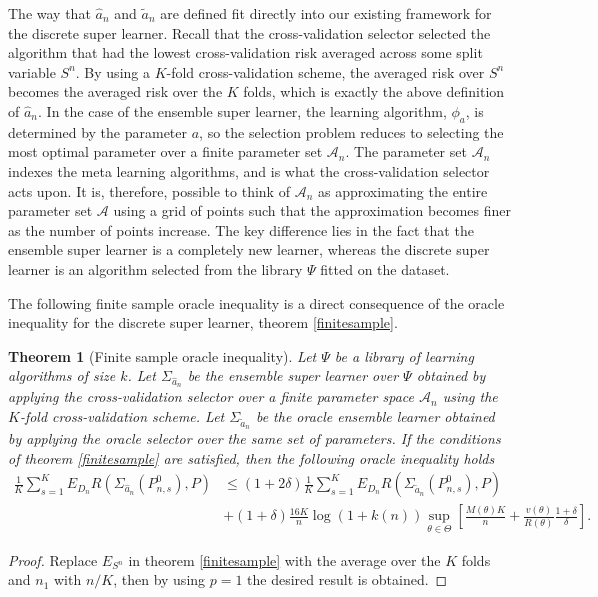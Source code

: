 \documentclass[11pt, a4paper]{article}
\newtheorem{theorem}{Theorem}
\theoremstyle{definition}
\theoremstyle{remark}
\newcommand{\btheta}{\theta}
\newcommand{\Sn}{S^n}
\newcommand{\lib}{\Psi}
\newcommand{\meta}{\phi}
\newcommand{\esl}{\Sigma}
\begin{document}
The way that $ \hat{a}_n  $ and $ \tilde{a}_n $ are defined fit directly into our existing framework for the discrete super learner. Recall that the cross-validation selector selected the algorithm that had the lowest cross-validation risk averaged across some split variable $ \Sn $. By using a $ K $-fold cross-validation scheme, the averaged risk over $ \Sn $ becomes the averaged risk over the $ K $ folds, which is exactly the above definition of $ \hat{a}_n $. In the case of the ensemble super learner, the learning algorithm, $ \meta_{a} $, is determined by the parameter $ a $, so the selection problem reduces to selecting the most optimal parameter over a finite parameter set $ \mathcal{A}_n $. The parameter set $ \mathcal{A}_n $ indexes the meta learning algorithms, and is what the cross-validation selector acts upon. It is, therefore, possible to think of $ \mathcal{A}_n $ as approximating the entire parameter set $ \mathcal{A} $ using a grid of points such that the approximation becomes finer as the number of points increase. The key difference lies in the fact that the ensemble super learner is a completely new learner, whereas the discrete super learner is an algorithm selected from the library $ \lib $ fitted on the dataset.

The following finite sample oracle inequality is a direct consequence of the oracle inequality for the discrete super learner, theorem \ref{finitesample}.
\begin{theorem}[Finite sample oracle inequality]
    Let $ \lib $ be a library of learning algorithms of size $ k $. Let $ \esl_{ \hat{a}_{n} } $ be the ensemble super learner over $ \lib $ obtained by applying the cross-validation selector over a finite parameter space $ \mathcal{A}_n $ using the $ K $-fold cross-validation scheme. Let $ \esl_{ \tilde{a}_n } $ be the oracle ensemble learner obtained by applying the oracle selector over the same set of parameters. If the conditions of theorem \ref{finitesample} are satisfied, then the following oracle inequality holds
    \begin{align*}
        \frac{1}{K} \sum_{s = 1}^{K} E_{D_n} R(\esl_{ \hat{a}_n }(P_{n, s}^{0}) , P) &\leq (1 + 2 \delta) \frac{1}{K} \sum_{s = 1}^{K} E_{D_n} R(\esl_{ \tilde{a}_n }(P_{n,s}^{0}), P) \\
                                                                                     &+ (1 + \delta) \frac{16 K}{n} \log(1 + k(n)) \sup_{\btheta \in \Theta} \left[ \frac{M(\btheta) K}{n} + \frac{v(\btheta)}{R(\btheta)} \frac{1 + \delta}{\delta} \right].  
    \end{align*}
\end{theorem}
\begin{proof}
    Replace $ E_{\Sn} $ in theorem \ref{finitesample} with the average over the $ K $ folds and $ n_1$ with $n/K $, then by using $ p = 1 $ the desired result is obtained.  
\end{proof}
\end{document}
